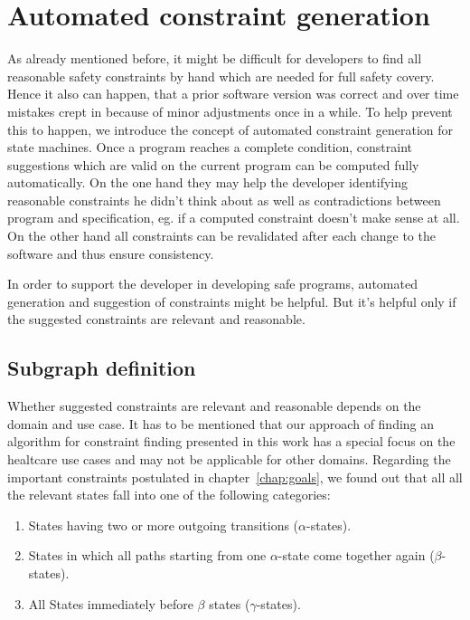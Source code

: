 \chapter{Automated constraint generation}
\label{chap:automatedconstraintgeneration}

As already mentioned before, it might be difficult for developers to find all reasonable safety constraints by hand which are needed for full safety covery. Hence it also can happen, that a prior software version was correct and over time mistakes crept in because of minor adjustments once in a while.
To help prevent this to happen, we introduce the concept of automated constraint generation for state machines. Once a program reaches a complete condition, constraint suggestions which are valid on the current program can be computed fully automatically. On the one hand they may help the developer identifying reasonable constraints he didn't think about as well as contradictions between program and specification, eg. if a computed constraint doesn't make sense at all. On the other hand all constraints can be revalidated after each change to the software and thus ensure consistency.

In order to support the developer in developing safe programs, automated generation and suggestion of constraints might be helpful. But it's helpful only if the suggested constraints are relevant and reasonable.


\section{Subgraph definition}
\label{sec:subgraphdefinition}

Whether suggested constraints are relevant and reasonable
depends on the domain and use case. It has to be mentioned that our approach of finding an algorithm for constraint finding presented in this work has a special focus on the healtcare use cases and may not be applicable for other domains.
Regarding the important constraints postulated in chapter~\ref{chap:goals}, we found out that all all the relevant states fall into one of the following categories:

\begin{enumerate}
	\item States having two or more outgoing transitions ($\alpha$-states).
	\item States in which all paths starting from one $\alpha$-state come together again ($\beta$-states).
	\item All States immediately before $\beta$ states ($\gamma$-states).
\end{enumerate}

